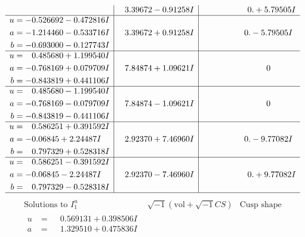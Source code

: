 \documentclass[1p]{elsarticle_modified}
\theoremstyle{definition}
\newcommand{\I}{\sqrt{-1}}
\begin{document}
$$\begin{array}{c|c|c}
 & \phantom{-}3.39672 - 0.91258 I & \phantom{-0.000000 -}0. + 5.79505 I \\ \hline\begin{aligned}
u &= -0.526692 - 0.472816 I \\
a &= -1.214460 - 0.533716 I \\
b &= -0.693000 - 0.127743 I\end{aligned}
 & \phantom{-}3.39672 + 0.91258 I & \phantom{-0.000000 } 0. - 5.79505 I \\ \hline\begin{aligned}
u &= \phantom{-}0.485680 + 1.199540 I \\
a &= -0.768169 + 0.079709 I \\
b &= -0.843819 + 0.441106 I\end{aligned}
 & \phantom{-}7.84874 + 1.09621 I & \phantom{-0.000000 } 0 \\ \hline\begin{aligned}
u &= \phantom{-}0.485680 - 1.199540 I \\
a &= -0.768169 - 0.079709 I \\
b &= -0.843819 - 0.441106 I\end{aligned}
 & \phantom{-}7.84874 - 1.09621 I & \phantom{-0.000000 } 0 \\ \hline\begin{aligned}
u &= \phantom{-}0.586251 + 0.391592 I \\
a &= -0.06845 + 2.24487 I \\
b &= \phantom{-}0.797329 + 0.528318 I\end{aligned}
 & \phantom{-}2.92370 + 7.46960 I & \phantom{-0.000000 } 0. - 9.77082 I \\ \hline\begin{aligned}
u &= \phantom{-}0.586251 - 0.391592 I \\
a &= -0.06845 - 2.24487 I \\
b &= \phantom{-}0.797329 - 0.528318 I\end{aligned}
 & \phantom{-}2.92370 - 7.46960 I & \phantom{-0.000000 -}0. + 9.77082 I\\
 \hline 
 \end{array}$$\newpage$$\begin{array}{c|c|c}  
\text{Solutions to }I^u_{1}& \I (\text{vol} + \sqrt{-1}CS) & \text{Cusp shape}\\
 \hline 
\begin{aligned}
u &= \phantom{-}0.569131 + 0.398506 I \\
a &= \phantom{-}1.329510 + 0.475836 I \\

\end{aligned}
\end{array}$$
\end{document}
